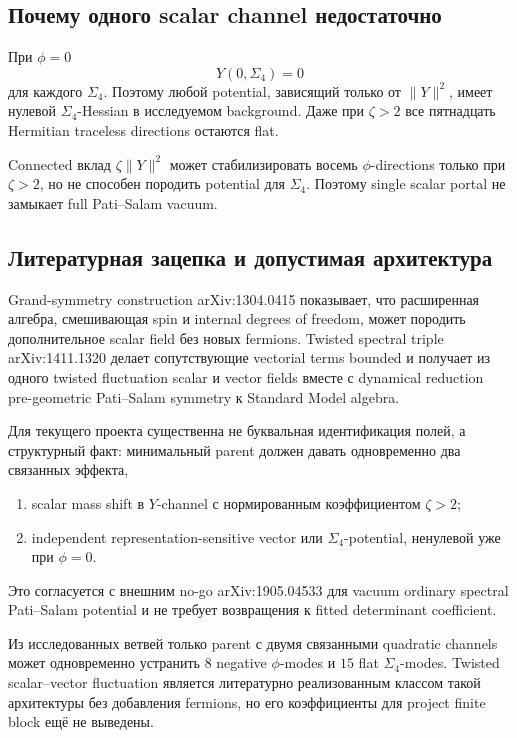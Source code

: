 \subsection{Почему одного scalar channel недостаточно}

При \(\phi=0\)
\begin{equation}
 Y(0,\Sigma_4)=0
\end{equation}
для каждого \(\Sigma_4\). Поэтому любой potential, зависящий только от
\(\|Y\|^2\), имеет нулевой \(\Sigma_4\)-Hessian в исследуемом background.
Даже при \(\zeta>2\) все пятнадцать Hermitian traceless directions остаются
flat.

\begin{nogocriterion}
Connected вклад \(\zeta\|Y\|^2\) может стабилизировать восемь
\(\phi\)-directions только при \(\zeta>2\), но не способен породить
potential для \(\Sigma_4\). Поэтому single scalar portal не замыкает full
Pati--Salam vacuum.
\end{nogocriterion}

\subsection{Литературная зацепка и допустимая архитектура}

Grand-symmetry construction arXiv:1304.0415 показывает, что расширенная
алгебра, смешивающая spin и internal degrees of freedom, может породить
дополнительное scalar field без новых fermions. Twisted spectral triple
arXiv:1411.1320 делает сопутствующие vectorial terms bounded и получает из
одного twisted fluctuation scalar и vector fields вместе с dynamical
reduction pre-geometric Pati--Salam symmetry к Standard Model algebra.

Для текущего проекта существенна не буквальная идентификация полей, а
структурный факт: минимальный parent должен давать одновременно два
связанных эффекта,
\begin{enumerate}
 \item scalar mass shift в \(Y\)-channel с нормированным коэффициентом
 \(\zeta>2\);
 \item independent representation-sensitive vector или
 \(\Sigma_4\)-potential, ненулевой уже при \(\phi=0\).
\end{enumerate}
Это согласуется с внешним no-go arXiv:1905.04533 для vacuum ordinary
spectral Pati--Salam potential и не требует возвращения к fitted
determinant coefficient.

\begin{proposition}
Из исследованных ветвей только parent с двумя связанными quadratic channels
может одновременно устранить \(8\) negative \(\phi\)-modes и \(15\) flat
\(\Sigma_4\)-modes. Twisted scalar--vector fluctuation является
литературно реализованным классом такой архитектуры без добавления fermions,
но его коэффициенты для project finite block ещё не выведены.
\end{proposition}


